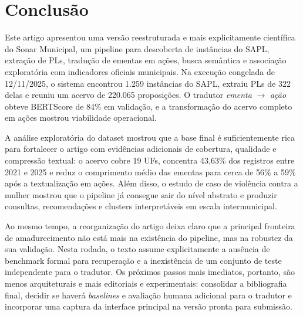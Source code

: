 \section{Conclusão}

Este artigo apresentou uma versão reestruturada e mais explicitamente científica do Sonar Municipal, um pipeline para descoberta de instâncias do SAPL, extração de PLs, tradução de ementas em ações, busca semântica e associação exploratória com indicadores oficiais municipais. Na execução congelada de 12/11/2025, o sistema encontrou 1.259 instâncias do SAPL, extraiu PLs de 322 delas e reuniu um acervo de 220.065 proposições. O tradutor \textit{ementa} $\rightarrow$ \textit{ação} obteve BERTScore de 84\% em validação, e a transformação do acervo completo em ações mostrou viabilidade operacional.

A análise exploratória do dataset mostrou que a base final é suficientemente rica para fortalecer o artigo com evidências adicionais de cobertura, qualidade e compressão textual: o acervo cobre 19 UFs, concentra 43,63\% dos registros entre 2021 e 2025 e reduz o comprimento médio das ementas para cerca de 56\% a 59\% após a textualização em ações. Além disso, o estudo de caso de violência contra a mulher mostrou que o pipeline já consegue sair do nível abstrato e produzir consultas, recomendações e clusters interpretáveis em escala intermunicipal.

Ao mesmo tempo, a reorganização do artigo deixa claro que a principal fronteira de amadurecimento não está mais na existência do pipeline, mas na robustez da sua validação. Nesta rodada, o texto assume explicitamente a ausência de benchmark formal para recuperação e a inexistência de um conjunto de teste independente para o tradutor. Os próximos passos mais imediatos, portanto, são menos arquiteturais e mais editoriais e experimentais: consolidar a bibliografia final, decidir se haverá \textit{baselines} e avaliação humana adicional para o tradutor e incorporar uma captura da interface principal na versão pronta para submissão.
